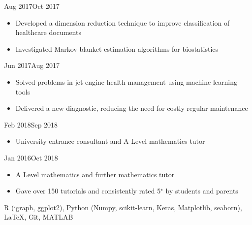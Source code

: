 \documentclass[
  date,
  number,
]{wgu-cv}
\begin{document}
{}
{Aug 2017}{Oct 2017}

\begin{itemize}
	\item Developed a dimension reduction technique to improve classification of healthcare documents
	\item Investigated Markov blanket estimation algorithms for biostatistics
\end{itemize}
	

{}
{Jun 2017}{Aug 2017}

\begin{itemize}
	\item Solved problems in jet engine health management using machine learning tools
	\item Delivered a new diagnostic, reducing the need for costly regular maintenance
\end{itemize}



{}
{Feb 2018}{Sep 2018}

\begin{itemize}
	\item University entrance consultant and A Level mathematics tutor
\end{itemize}


{}
{Jan 2016}{Oct 2018}

\begin{itemize}
	\item A Level mathematics and further mathematics tutor
	\item Gave over 150 tutorials and consistently rated 5$^\star$ by students and parents
\end{itemize}



R (igraph, ggplot2),
Python (Numpy, scikit-learn, Keras, Matplotlib, seaborn),
LaTeX,
Git,
MATLAB


\end{document}
